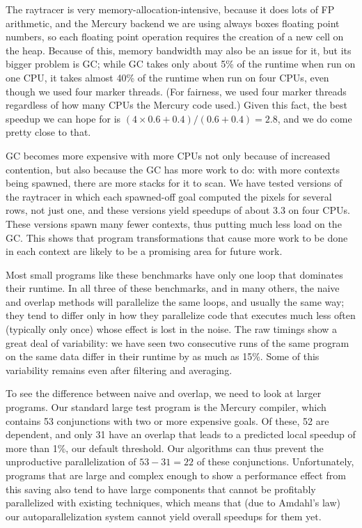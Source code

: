 The raytracer is very memory-allocation-intensive,
because it does lots of FP arithmetic,
and the Mercury backend we are using always boxes floating point numbers,
so each floating point operation requires
the creation of a new cell on the heap.
Because of this, memory bandwidth may also be an issue for it,
but its bigger problem is GC;
while GC takes only about 5\% of the runtime when run on one CPU,
it takes almost 40\% of the runtime when run on four CPUs,
even though we used four marker threads.
(For fairness, we used four marker threads
regardless of how many CPUs the Mercury code used.)
Given this fact, the best speedup we can hope for is
$(4 \times 0.6 + 0.4)/(0.6 + 0.4) = 2.8$,
and we do come pretty close to that.

GC becomes more expensive with more CPUs
not only because of increased contention,
but also because the GC has more work to do:
with more contexts being spawned, there are more stacks for it to scan.
We have tested versions of the raytracer in which
each spawned-off goal computed the pixels for several rows, not just one,
and these versions yield speedups of about 3.3 on four CPUs.
These versions spawn many fewer contexts, thus putting much less load
on the GC.
This shows that
program transformations that cause more work to be done in each context
are likely to be a promising area for future work.

Most small programs like these benchmarks
have only one loop that dominates their runtime.
In all three of these benchmarks, and in many others,
the naive and overlap methods will parallelize the same loops,
and usually the same way;
they tend to differ only in how they parallelize code
that executes much less often (typically only once)
whose effect is lost in the noise.
The raw timings show a great deal of variability:
we have seen two consecutive runs of the same program on the same data
differ in their runtime by as much as 15\%.
Some of this variability remains even after filtering and averaging.

To see the difference between naive and overlap,
we need to look at larger programs.
Our standard large test program is the Mercury compiler, which contains
53 conjunctions with two or more expensive goals.
Of these, 52 are dependent,
and only 31 have an overlap
that leads to a predicted local speedup of more than 1\%,
our default threshold.
Our algorithms can thus prevent
the unproductive parallelization of $53-31=22$ of these conjunctions.
Unfortunately, programs that are large and complex enough
to show a performance effect from this saving
also tend to have large components
that cannot be profitably parallelized with existing techniques,
which means that (due to Amdahl's law)
our autoparallelization system cannot yield overall speedups for them yet.

